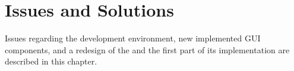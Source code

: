 
\chapter{Issues and Solutions}

Issues regarding the development environment, new implemented GUI components, and a redesign of the \ct and the first part of its implementation are described in this chapter.








